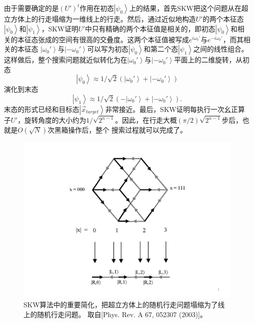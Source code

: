 由于需要确定的是$(U')^t$作用在初态$\left\vert \psi_{0} \right \rangle$上的结果，首先SKW把这个问题从在超立方体上的行走塌缩为一维线上的行走。然后，通过近似地构造$U'$的两个本征态
$\left\vert \psi_{0} \right \rangle$和$\left\vert \psi_{1} \right \rangle$，SKW证明$U'$中只有精确的两个本征值是相关的，即初态$\left\vert \psi_{0} \right \rangle$和相关的本征态张成的空间有很高的交叠度。这两个本征值被写成$e^{i\omega_0'}$与$e^{-i\omega_0'}$，而其相关的本征态
$\left\vert \omega_0' \right \rangle$与$\left\vert -\omega_0' \right \rangle$可以写为初态$\left\vert \psi_{0} \right \rangle$和第二个态$\left\vert \psi_{1} \right \rangle$之间的线性组合。这样做后，整个搜索问题就近似转化为在$\left\vert \omega_0' \right \rangle$与$\left\vert -\omega_0' \right \rangle$平面上的二维旋转，从初态
\begin{equation}
     \left\vert \psi_{0} \right \rangle \approx 1/\sqrt{2}(\left\vert \omega_0' \right \rangle+\left\vert -\omega_0' \right \rangle)
\end{equation}
演化到末态
\begin{equation}
     \left\vert \psi_{1} \right \rangle \approx 1/\sqrt{2}(-\left\vert \omega_0' \right \rangle+\left\vert -\omega_0' \right \rangle).
\end{equation}
末态的形式已经和目标态$\left\vert \overrightarrow{x} _{target} \right \rangle $非常接近。最后，SKW证明每执行一次幺正算子$U'$，旋转角度的大小约为$1/\sqrt{2^{n-1}}$。因此，在行走大概$(\pi/2)\sqrt{2^{n-1}}$步后，也就是$O(\sqrt{N})$次黑箱操作后，整个
搜索过程就可以完成了。


\begin{figure}[htbp]
            \begin{center}
              \includegraphics[width= 0.8\columnwidth]{figures/skw.pdf}
              \caption{SKW算法中的重要简化，把超立方体上的随机行走问题塌缩为了线上的随机行走问题。
              取自[Phys. Rev. A 67, 052307 (2003)]\cite{skw}。
              }
              \label{skw}
            \end{center}
 \end{figure}


